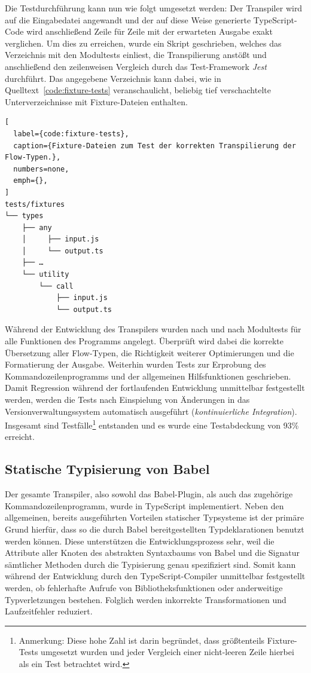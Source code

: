 Die Testdurchführung kann nun wie folgt umgesetzt werden: Der Transpiler wird auf die Eingabedatei angewandt und der auf diese Weise generierte TypeScript-Code wird anschließend Zeile für Zeile mit der erwarteten Ausgabe exakt verglichen. Um dies zu erreichen, wurde ein Skript geschrieben, welches das Verzeichnis mit den Modultests einliest, die Transpilierung anstößt und anschließend den zeilenweisen Vergleich durch das Test-Framework \textit{Jest}~\autocite{SOFTWARE:JEST} durchführt. Das angegebene Verzeichnis kann dabei, wie in Quelltext~\ref{code:fixture-tests} veranschaulicht, beliebig tief verschachtelte Unterverzeichnisse mit Fixture-Dateien enthalten.

\begin{lstlisting}[
  label={code:fixture-tests},
  caption={Fixture-Dateien zum Test der korrekten Transpilierung der Flow-Typen.},
  numbers=none,
  emph={},
]
tests/fixtures
└── types
    ├── any
    │     ├── input.js
    │     └── output.ts
    ├── …
    └── utility
        └── call
            ├── input.js
            └── output.ts
\end{lstlisting}

Während der Entwicklung des Transpilers wurden nach und nach Modultests für alle Funktionen des Programms angelegt. Überprüft wird dabei die korrekte Übersetzung aller Flow-Typen, die Richtigkeit weiterer Optimierungen und die Formatierung der Ausgabe. Weiterhin wurden Tests zur Erprobung des Kommandozeilenprogramms und der allgemeinen Hilfsfunktionen geschrieben. Damit Regression während der fortlaufenden Entwicklung unmittelbar festgestellt werden, werden die Tests nach Einspielung von Änderungen in das Versionverwaltungssystem automatisch ausgeführt (\textit{kontinuierliche Integration}). Insgesamt sind \numberOfTests Testfälle\footnote{Anmerkung: Diese hohe Zahl ist darin begründet, dass größtenteils Fixture-Tests umgesetzt wurden und jeder Vergleich einer nicht-leeren Zeile hierbei als ein Test betrachtet wird.} entstanden und es wurde eine Testabdeckung von 93\% erreicht.

\subsection{Statische Typisierung von Babel}

Der gesamte Transpiler, also sowohl das Babel-Plugin, als auch das zugehörige Kommandozeilenprogramm, wurde in TypeScript implementiert. Neben den allgemeinen, bereits ausgeführten Vorteilen statischer Typsysteme ist der primäre Grund hierfür, dass so die durch Babel bereitgestellten Typdeklarationen benutzt werden können. Diese unterstützen die Entwicklungsprozess sehr, weil die Attribute aller Knoten des abstrakten Syntaxbaums von Babel und die Signatur sämtlicher Methoden durch die Typisierung genau spezifiziert sind. Somit kann während der Entwicklung durch den TypeScript-Compiler unmittelbar festgestellt werden, ob fehlerhafte Aufrufe von Bibliotheksfunktionen oder anderweitige Typverletzungen bestehen. Folglich werden inkorrekte Transformationen und Laufzeitfehler reduziert.

